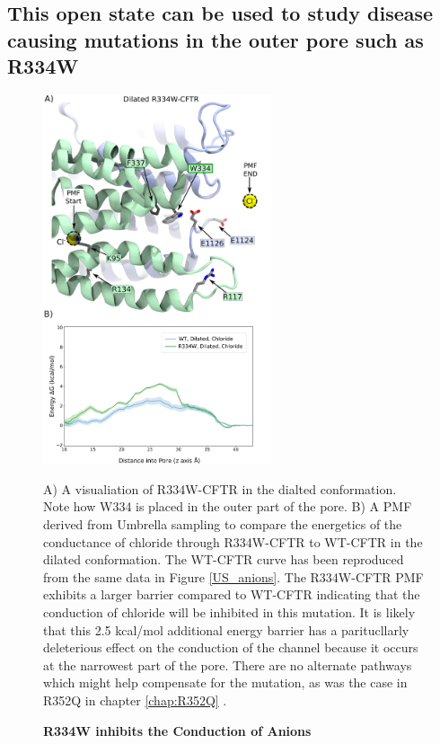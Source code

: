 \subsection{This open state can be used to study disease causing mutations in the outer pore such as R334W}


\begin{figure}
	\label{R334_pmf}
	\begin{center}
		\includegraphics[width=0.6\textwidth]{figures/opening/R334W_pmf_combined.pdf}
	\end{center}
	\captionsetup{singlelinecheck = false, justification=raggedright}
	\caption[R334W Inhibits the Conduction of Anions] {\textbf{R334W inhibits the Conduction of Anions}}{A) A visualiation of R334W-CFTR in the dialted  conformation. Note how W334 is placed in the outer part of the pore. B) A PMF derived from Umbrella sampling to compare the energetics of the conductance of chloride through R334W-CFTR to WT-CFTR in the dilated conformation. The WT-CFTR curve has been reproduced from the same data in Figure \ref{US_anions}. The R334W-CFTR PMF exhibits a larger barrier compared to WT-CFTR indicating that the conduction of chloride will be inhibited in this mutation. It is likely that this 2.5 kcal/mol additional energy barrier has a paritucllarly deleterious effect on the conduction of the channel because it occurs at the narrowest part of the pore. There are no alternate pathways which might help compensate for the mutation, as was the case in R352Q in chapter \ref{chap:R352Q} \cite{wong2022a}.  }
\end{figure}

